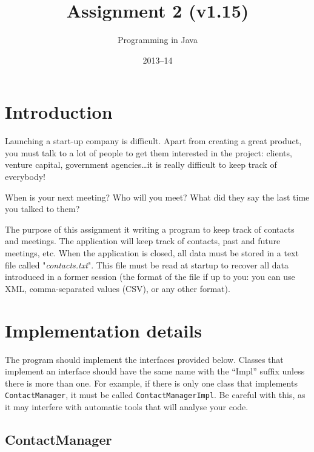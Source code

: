 \documentclass{article}
\title{Assignment 2 (v1.15)}
\author{Programming in Java}
\date{2013--14}
\begin{document}
\maketitle

\section{Introduction}
\label{sec:introduction}

Launching a start-up company is difficult. Apart from creating a great
product, you must talk to a lot of people to get them interested in
the project: clients, venture capital, government agencies\ldots it is
really difficult to keep track of everybody! 

When is your next meeting? Who will you meet? What did they say the
last time you talked to them?

The purpose of this assignment it writing a program to keep track of
contacts and meetings. The application will keep track of contacts,
past and future meetings, etc. When the application is closed, all
data must be stored in a text file called "\emph{contacts.txt}". This
file must be read at startup to recover all data introduced in a
former session (the format of the file if up to you: you can use XML,
comma-separated values (CSV), or any other format).

\section{Implementation details}
\label{sec:impl-deta}

The program should implement the interfaces
provided below. Classes that implement an interface should have the same
name with the ``Impl'' suffix unless there is more than one. For
example, if there is only one class that implements
\verb+ContactManager+, it must be called \verb+ContactManagerImpl+. Be
careful with this, as it may interfere with automatic tools that will
analyse your code. 

\subsection{ContactManager}
\label{sec:contactmanager}

\end{document}
